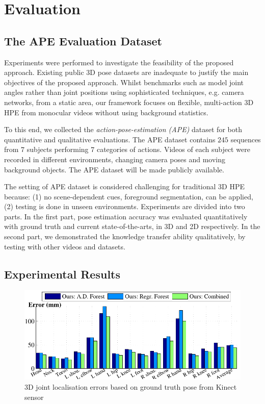 \section{Evaluation}
\label{sec/body/evaluation}

\subsection{The APE Evaluation Dataset}
Experiments were performed to investigate the feasibility of the proposed approach. 
Existing public 3D pose datasets are inadequate to justify the main objectives of the proposed approach. Whilst benchmarks such as \cite{Sigal2010, Yao2012} model joint angles rather than joint positions using sophisticated techniques, e.g. camera networks, from a static area, our framework focuses on flexible, multi-action 3D HPE from monocular videos without using background statistics.

To this end, we collected the \emph{action-pose-estimation (APE)} dataset for both quantitative and qualitative evaluations. The APE dataset contains $245$ sequences from $7$ subjects performing $7$ categories of actions. Videos of each subject were recorded in different environments, changing camera poses and moving background objects. The APE dataset will be made publicly available. 

The setting of APE dataset is considered challenging for traditional 3D HPE because: (1) no scene-dependent cues, \eg foreground segmentation, can be applied, (2) testing is done in unseen environments. 
Experiments are divided into two parts. In the first part, pose estimation accuracy was evaluated quantitatively with ground truth and current state-of-the-arts, in 3D and 2D respectively. In the second part, we demonstrated the knowledge transfer ability qualitatively, by testing with other videos and datasets.     


\subsection{Experimental Results}

\begin{figure}[ht]
\centering
	\includegraphics[width=0.8\linewidth]{fig/body/errplot3d.pdf} 
	\caption{3D joint localisation errors based on ground truth pose from Kinect sensor}
\label{fig/body/errorplot3d}
\end{figure}



